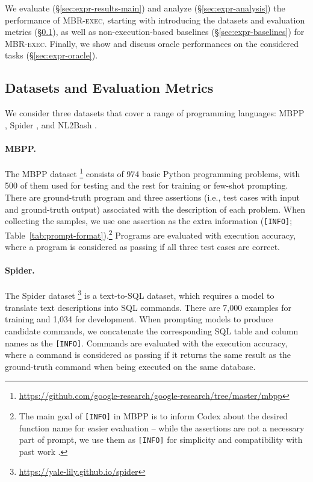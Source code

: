 \documentclass[11pt]{article}
\newcommand{\mbrexec}{\textsc{MBR-exec}\xspace}
\begin{document}
We evaluate (\S\ref{sec:expr-results-main}) and analyze (\S\ref{sec:expr-analysis}) the performance of \mbrexec, starting with introducing the datasets and evaluation metrics (\S\ref{sec:expr-datasets}), as well as non-execution-based baselines (\S\ref{sec:expr-baselines}) for \mbrexec. Finally, we show and discuss oracle performances on the considered tasks (\S\ref{sec:expr-oracle}).
\subsection{Datasets and Evaluation Metrics}
\label{sec:expr-datasets}
We consider three datasets that cover a range of programming languages: MBPP \citep[Python;][]{austin2021program}, Spider \citep[SQL;][]{yu-etal-2018-spider}, and NL2Bash \citep[Bash;][]{lin-etal-2018-nl2bash}. 

\paragraph{MBPP.} 
The MBPP dataset \citep{austin2021program}\footnote{
    \url{https://github.com/google-research/google-research/tree/master/mbpp}
} 
consists of 974 basic Python programming problems, with 500 of them used for testing and the rest for training or few-shot prompting. There are ground-truth program and three assertions (i.e., test cases with input and ground-truth output) associated with the description of each problem. When collecting the samples, we use one assertion as the extra information (\texttt{[INFO]}; Table~\ref{tab:prompt-format}).\footnote{The main goal of \texttt{[INFO]} in MBPP is to inform Codex about the desired function name for easier evaluation -- while the assertions are not a necessary part of prompt, we use them as \texttt{[INFO]} for simplicity and compatibility with past work \citep{austin2021program}. } Programs are evaluated with execution accuracy, where a program is considered as passing if all three test cases are correct.

\paragraph{Spider.}
The Spider dataset \citep{yu-etal-2018-spider}\footnote{\url{https://yale-lily.github.io/spider}} is a text-to-SQL dataset, which requires a model to translate text descriptions into SQL commands. There are 7,000 examples for training and 1,034 for development. When prompting models to produce candidate commands, we concatenate the corresponding SQL table and column names as the \texttt{[INFO]}. Commands are evaluated with the execution accuracy, where a command is considered as passing if it returns the same result as the ground-truth command when being executed on the same database.
\end{document}
